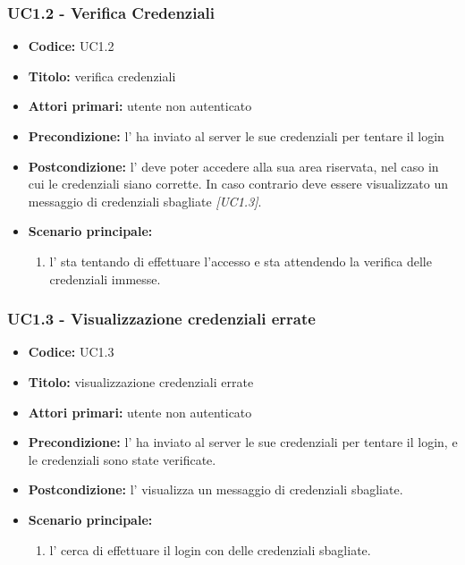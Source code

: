 \documentclass[casi-duso]{subfiles}
\begin{document}
\subsubsection{UC1.2 - Verifica Credenziali}
\label{subsub:UC1.2}
\begin{itemize}
  \item \textbf{Codice:} UC1.2
  \item \textbf{Titolo:} verifica credenziali
  \item \textbf{Attori primari:} utente non autenticato
  \item \textbf{Precondizione:} l' ha inviato al server le sue credenziali per tentare il login
  \item \textbf{Postcondizione:} l' deve poter accedere alla sua area riservata, nel caso in cui le credenziali siano corrette. In caso
  contrario deve essere visualizzato un messaggio di credenziali sbagliate \emph{[UC1.3]}.
  \item \textbf{Scenario principale:} 
  \begin{enumerate}
    \item l' sta tentando di effettuare l'accesso e sta attendendo la verifica delle credenziali immesse.
  \end{enumerate}
\end{itemize}

\subsubsection{UC1.3 - Visualizzazione credenziali errate}
\label{subsub:UC1.3}
\begin{itemize}
  \item \textbf{Codice:} UC1.3
  \item \textbf{Titolo:} visualizzazione credenziali errate
  \item \textbf{Attori primari:} utente non autenticato
  \item \textbf{Precondizione:} l' ha inviato al server le sue credenziali per tentare il login, e le credenziali sono state verificate.
  \item \textbf{Postcondizione:} l' visualizza un messaggio di credenziali sbagliate.
  \item \textbf{Scenario principale:} 
  \begin{enumerate}
    \item l' cerca di effettuare il login con delle credenziali sbagliate. 
  \end{enumerate}
\end{itemize}
\end{document}
